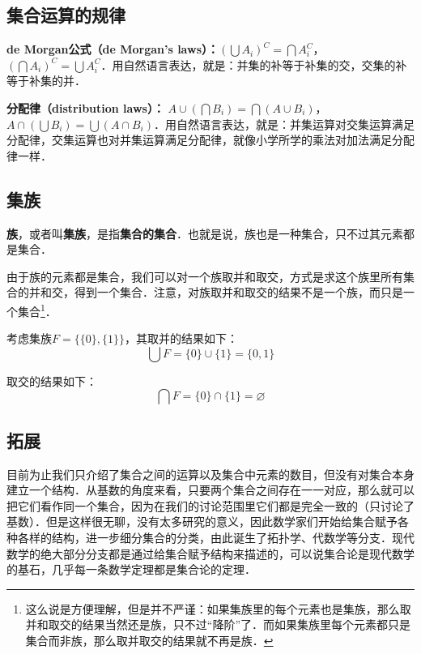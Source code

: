 \subsection{集合运算的规律}

\textbf{de Morgan公式（de Morgan's laws）：}$(\bigcup A_i)^C=\bigcap A_i^C$，$(\bigcap A_i)^C=\bigcup A_i^C$．用自然语言表达，就是：并集的补等于补集的交，交集的补等于补集的并．

\textbf{分配律（distribution laws）：} $A\cup(\bigcap B_i)=\bigcap (A\cup B_i)$，$A\cap(\bigcup B_i)=\bigcup (A\cap B_i)$．用自然语言表达，就是：并集运算对交集运算满足分配律，交集运算也对并集运算满足分配律，就像小学所学的乘法对加法满足分配律一样．


\subsection{集族}

\textbf{族}，或者叫\textbf{集族}，是指\textbf{集合的集合}．也就是说，族也是一种集合，只不过其元素都是集合．

由于族的元素都是集合，我们可以对一个族取并和取交，方式是求这个族里所有集合的并和交，得到一个集合．注意，对族取并和取交的结果不是一个族，而只是一个集合\footnote{这么说是方便理解，但是并不严谨：如果集族里的每个元素也是集族，那么取并和取交的结果当然还是族，只不过“降阶”了．而如果集族里每个元素都只是集合而非族，那么取并取交的结果就不再是族．}．

\begin{example}{}
考虑集族$F=\{\{0\}, \{1\}\}$，其取并的结果如下：
\begin{equation}
\bigcup F=\{0\}\cup\{1\}=\{0, 1\}
\end{equation}

取交的结果如下：
\begin{equation}
\bigcap F=\{0\}\cap\{1\}=\varnothing
\end{equation}
\end{example}



\subsection{拓展}
目前为止我们只介绍了集合之间的运算以及集合中元素的数目，但没有对集合本身建立一个结构．从基数的角度来看，只要两个集合之间存在一一对应，那么就可以把它们看作同一个集合，因为在我们的讨论范围里它们都是完全一致的（只讨论了基数）．但是这样很无聊，没有太多研究的意义，因此数学家们开始给集合赋予各种各样的结构，进一步细分集合的分类，由此诞生了拓扑学、代数学等分支．现代数学的绝大部分分支都是通过给集合赋予结构来描述的，可以说集合论是现代数学的基石，几乎每一条数学定理都是集合论的定理．
